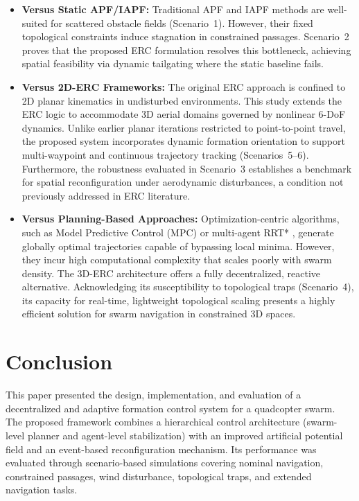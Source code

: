 \documentclass[pdflatex,sn-basic]{sn-jnl}%
\begin{document}
        \begin{itemize}
            \item \textbf{Versus Static APF/IAPF:} Traditional APF and IAPF methods \citep{khatib_real-time_1985, wang_uav_2021, prabaswara_collision-free_2025} are well-suited for scattered obstacle fields (Scenario~1). However, their fixed topological constraints induce stagnation in constrained passages. Scenario~2 proves that the proposed ERC formulation resolves this bottleneck, achieving spatial feasibility via dynamic tailgating where the static baseline fails.
            \item \textbf{Versus 2D-ERC Frameworks:} The original ERC approach \citep{bui_event-based_2025} is confined to 2D planar kinematics in undisturbed environments. This study extends the ERC logic to accommodate 3D aerial domains governed by nonlinear 6-DoF dynamics. Unlike earlier planar iterations restricted to point-to-point travel, the proposed system incorporates dynamic formation orientation to support multi-waypoint and continuous trajectory tracking (Scenarios~5--6). Furthermore, the robustness evaluated in Scenario~3 establishes a benchmark for spatial reconfiguration under aerodynamic disturbances, a condition not previously addressed in ERC literature.
            \item \textbf{Versus Planning-Based Approaches:} Optimization-centric algorithms, such as Model Predictive Control (MPC) or multi-agent RRT* \citep{kallies_multi-agent_2024, burzynski_trajectory_2024}, generate globally optimal trajectories capable of bypassing local minima. However, they incur high computational complexity that scales poorly with swarm density. The 3D-ERC architecture offers a fully decentralized, reactive alternative. Acknowledging its susceptibility to topological traps (Scenario~4), its capacity for real-time, lightweight topological scaling presents a highly efficient solution for swarm navigation in constrained 3D spaces.
        \end{itemize}

\section{Conclusion}
    This paper presented the design, implementation, and evaluation of a decentralized and adaptive formation control system for a quadcopter swarm. The proposed framework combines a hierarchical control architecture (swarm-level planner and agent-level stabilization) with an improved artificial potential field and an event-based reconfiguration mechanism. Its performance was evaluated through scenario-based simulations covering nominal navigation, constrained passages, wind disturbance, topological traps, and extended navigation tasks.
    
\end{document}
